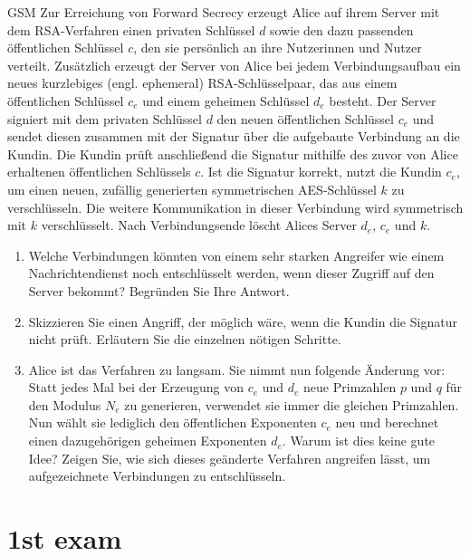 \documentclass{article}
\begin{document}
\begin{exercise}{GSM}
  Zur Erreichung von Forward Secrecy erzeugt Alice auf ihrem Server mit dem RSA-Verfahren einen privaten Schlüssel $d$ sowie den dazu passenden öffentlichen Schlüssel $c$, den sie persönlich an ihre Nutzerinnen und Nutzer verteilt. Zusätzlich erzeugt der Server von Alice bei jedem Verbindungsaufbau ein neues kurzlebiges (engl. ephemeral) RSA-Schlüsselpaar, das aus einem öffentlichen Schlüssel $c_e$ und einem geheimen Schlüssel $d_e$ besteht. Der Server signiert mit dem privaten Schlüssel $d$ den neuen öffentlichen Schlüssel $c_e$ und sendet diesen zusammen mit der Signatur über die aufgebaute Verbindung an die Kundin. Die Kundin prüft anschließend die Signatur mithilfe des zuvor von Alice erhaltenen öffentlichen Schlüssels $c$. Ist die Signatur korrekt, nutzt die Kundin $c_e$, um einen neuen, zufällig generierten symmetrischen AES-Schlüssel $k$ zu verschlüsseln. Die weitere Kommunikation in dieser Verbindung wird symmetrisch mit $k$ verschlüsselt. Nach Verbindungsende löscht Alices Server $d_e$, $c_e$ und $k$.

  \begin{enumerate}
    \item Welche Verbindungen könnten von einem sehr starken Angreifer wie einem Nachrichtendienst noch entschlüsselt werden, wenn dieser Zugriff auf den Server bekommt? Begründen Sie Ihre Antwort.
    \item Skizzieren Sie einen Angriff, der möglich wäre, wenn die Kundin die Signatur nicht prüft. Erläutern Sie die einzelnen nötigen Schritte.
    \item Alice ist das Verfahren zu langsam. Sie nimmt nun folgende Änderung vor: Statt jedes Mal bei der Erzeugung von $c_e$ und $d_e$ neue Primzahlen $p$ und $q$ für den Modulus $N_e$ zu generieren, verwendet sie immer die gleichen Primzahlen. Nun wählt sie lediglich den öffentlichen Exponenten $c_e$ neu und berechnet einen dazugehörigen geheimen Exponenten $d_e$. Warum ist dies keine gute Idee? Zeigen Sie, wie sich dieses geänderte Verfahren angreifen lässt, um aufgezeichnete Verbindungen zu entschlüsseln.
  \end{enumerate}

  \begin{solution}
  \end{solution}
\end{exercise}



\section[2022]{1st exam}
\end{document}
